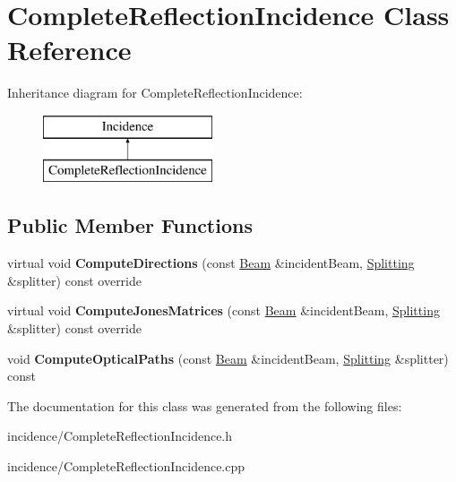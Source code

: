 \hypertarget{class_complete_reflection_incidence}{}\section{Complete\+Reflection\+Incidence Class Reference}
\label{class_complete_reflection_incidence}
Inheritance diagram for Complete\+Reflection\+Incidence\+:\begin{figure}[H]
\begin{center}
\leavevmode
\includegraphics[height=2.000000cm]{class_complete_reflection_incidence}
\end{center}
\end{figure}
\subsection*{Public Member Functions}
\begin{DoxyCompactItemize}
\item 
\mbox{\label{class_complete_reflection_incidence_a8dee432dac61f1d07d8826f7c955ae47}} 
virtual void {\bfseries Compute\+Directions} (const \mbox{\hyperlink{class_beam}{Beam}} \&incident\+Beam, \mbox{\hyperlink{class_splitting}{Splitting}} \&splitter) const override
\item 
\mbox{\label{class_complete_reflection_incidence_aaedb0c811fba421dd37ec85a2d6a3d19}} 
virtual void {\bfseries Compute\+Jones\+Matrices} (const \mbox{\hyperlink{class_beam}{Beam}} \&incident\+Beam, \mbox{\hyperlink{class_splitting}{Splitting}} \&splitter) const override
\item 
\mbox{\label{class_complete_reflection_incidence_a36f51c084d4aefecdb224ac0b791a552}} 
void {\bfseries Compute\+Optical\+Paths} (const \mbox{\hyperlink{class_beam}{Beam}} \&incident\+Beam, \mbox{\hyperlink{class_splitting}{Splitting}} \&splitter) const
\end{DoxyCompactItemize}


The documentation for this class was generated from the following files\+:\begin{DoxyCompactItemize}
\item 
incidence/Complete\+Reflection\+Incidence.\+h\item 
incidence/Complete\+Reflection\+Incidence.\+cpp\end{DoxyCompactItemize}
